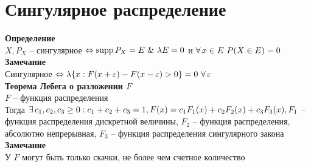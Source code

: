 \documentclass[12pt]{article}
\begin{document}
\section{Сингулярное распределение}
\textbf{Определение}\\
$X, P_X$ -- сингулярное $\LRto \supp P_X = E\ \&\ \lambda E = 0$ и $\forall\, x \in E\ P(X \in E) = 0$\\
\textbf{Замечание}\\
Сингулярное $\Leftrightarrow \lambda\{x: F(x+\varepsilon) - F(x - \varepsilon) > 0\} = 0\ \forall\, \varepsilon$\\
\textbf{Теорема Лебега о разложении $F$}\\
$F$ -- функция распределения\\
Тогда $\exists\, c_1, c_2, c_3 \geq 0: c_1 + c_2 + c_3 = 1, F(x) = c_1F_1(x) + c_2F_2(x) + c_3F_3(x), F_1$ -- функция распределения дискретной величины, $F_2$ -- функция распределения, абсолютно непрерывная, $F_3$ -- функция распределения сингулярного закона\\
\textbf{Замечание}\\
У $F$ могут быть только скачки, не более чем счетное количество
\end{document}
